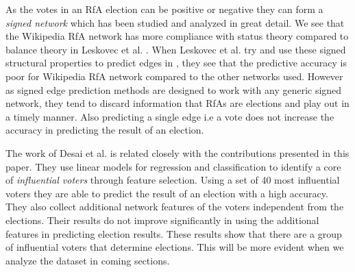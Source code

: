 As the votes in an RfA election can be positive or negative they can form a \textit{signed network} which has been studied and analyzed in great detail. We see that the Wikipedia RfA network has more compliance with status theory compared to balance theory in Leskovec et al. \cite{leskovecSigned}. When Leskovec et al. try and use these signed structural properties to predict edges in \cite{leskovecPredicting}, they see that the predictive accuracy is poor for Wikipedia RfA network compared to the other networks used. However as signed edge prediction methods are designed to work with any generic signed network, they tend to discard information that RfAs are elections and play out in a timely manner. Also predicting a single edge i.e a vote does not increase the accuracy in predicting the result of an election.   
\smallskip

The work of Desai et al. \cite{desai2014result} is related closely with the contributions presented in this paper. They use linear models for regression and classification to identify a core of \textit{influential voters} through feature selection. Using a set of 40 most influential voters they are able to predict the result of an election with a high accuracy. They also collect additional network features of the voters independent from the elections. Their results do not improve significantly in using the additional features in predicting election results. These results show that there are a group of influential voters that determine elections. This will be more evident when we analyze the dataset in coming sections.
